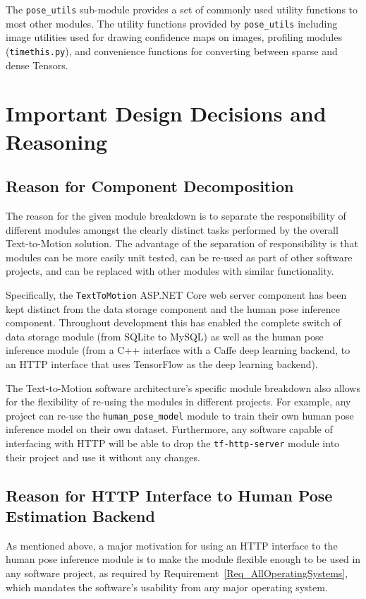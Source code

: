 \documentclass{scrreprt}
\begin{document}
The \verb|pose_utils| sub-module provides a set of commonly used utility
functions to most other modules. The utility functions provided by
\verb|pose_utils| including image utilities used for drawing confidence maps on
images, profiling modules (\verb|timethis.py|), and convenience functions for
converting between sparse and dense Tensors.

\chapter{Important Design Decisions and Reasoning}

\section{Reason for Component Decomposition}

The reason for the given module breakdown is to separate the responsibility of
different modules amongst the clearly distinct tasks performed by the overall
Text-to-Motion solution. The advantage of the separation of responsibility is
that modules can be more easily unit tested, can be re-used as part of other
software projects, and can be replaced with other modules with similar
functionality.

Specifically, the \verb|TextToMotion| ASP.NET Core web server component has
been kept distinct from the data storage component and the human pose inference
component. Throughout development this has enabled the complete switch of data
storage module (from SQLite to MySQL) as well as the human pose inference
module (from a C++ interface with a Caffe deep learning backend, to an HTTP
interface that uses TensorFlow as the deep learning backend).

The Text-to-Motion software architecture's specific module breakdown also
allows for the flexibility of re-using the modules in different projects. For
example, any project can re-use the \verb|human_pose_model| module to train
their own human pose inference model on their own dataset. Furthermore, any
software capable of interfacing with HTTP will be able to drop the
\verb|tf-http-server| module into their project and use it without any changes.

\section{Reason for HTTP Interface to Human Pose Estimation Backend}

As mentioned above, a major motivation for using an HTTP interface to the human
pose inference module is to make the module flexible enough to be used in any
software project, as required by Requirement~\ref{Req_AllOperatingSystems},
which mandates the software's usability from any major operating system.
\end{document}
